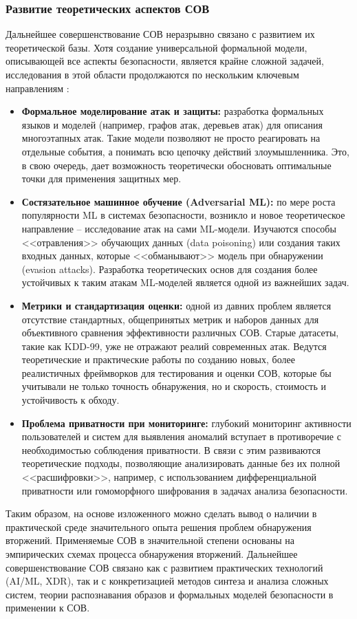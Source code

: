 \subsubsection{Развитие теоретических аспектов СОВ}

Дальнейшее совершенствование СОВ неразрывно связано с развитием их теоретической базы. Хотя создание универсальной формальной модели, описывающей все аспекты безопасности, является крайне сложной задачей, исследования в этой области продолжаются по нескольким ключевым направлениям \autocite{IDSBranitsky}:

\begin{itemize}
    \item \textbf{Формальное моделирование атак и защиты:} разработка формальных языков и моделей (например, графов атак, деревьев атак) для описания многоэтапных атак. Такие модели позволяют не просто реагировать на отдельные события, а понимать всю цепочку действий злоумышленника. Это, в свою очередь, дает возможность теоретически обосновать оптимальные точки для применения защитных мер.
    \item \textbf{Состязательное машинное обучение (Adversarial ML):} по мере роста популярности ML в системах безопасности, возникло и новое теоретическое направление -- исследование атак на сами ML-модели. Изучаются способы <<отравления>> обучающих данных (data poisoning) или создания таких входных данных, которые <<обманывают>> модель при обнаружении (evasion attacks). Разработка теоретических основ для создания более устойчивых к таким атакам ML-моделей является одной из важнейших задач.
    \item \textbf{Метрики и стандартизация оценки:} одной из давних проблем является отсутствие стандартных, общепринятых метрик и наборов данных для объективного сравнения эффективности различных СОВ. Старые датасеты, такие как KDD-99, уже не отражают реалий современных атак. Ведутся теоретические и практические работы по созданию новых, более реалистичных фреймворков для тестирования и оценки СОВ, которые бы учитывали не только точность обнаружения, но и скорость, стоимость и устойчивость к обходу.
    \item \textbf{Проблема приватности при мониторинге:} глубокий мониторинг активности пользователей и систем для выявления аномалий вступает в противоречие с необходимостью соблюдения приватности. В связи с этим развиваются теоретические подходы, позволяющие анализировать данные без их полной <<расшифровки>>, например, с использованием дифференциальной приватности или гомоморфного шифрования в задачах анализа безопасности.
\end{itemize}

Таким образом, на основе изложенного можно сделать вывод о наличии в практической среде значительного опыта решения проблем обнаружения вторжений. Применяемые СОВ в значительной степени основаны на эмпирических схемах процесса обнаружения вторжений. Дальнейшее совершенствование СОВ связано как с развитием практических технологий (AI/ML, XDR), так и с конкретизацией методов синтеза и анализа сложных систем, теории распознавания образов и формальных моделей безопасности в применении к СОВ.
